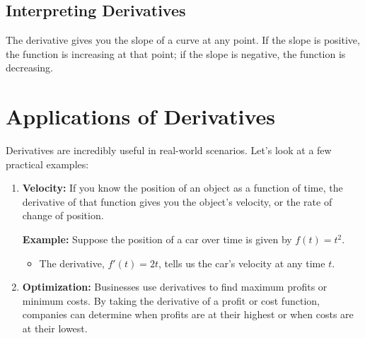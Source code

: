 \subsection{Interpreting Derivatives}
The derivative gives you the slope of a curve at any point. If the slope is positive, the function is increasing at that point; if the slope is negative, the function is decreasing.

\section{Applications of Derivatives}
Derivatives are incredibly useful in real-world scenarios. Let’s look at a few practical examples:
\begin{enumerate}
    \item \textbf{Velocity:} If you know the position of an object as a function of time, the derivative of that function gives you the object’s velocity, or the rate of change of position.

    \textbf{Example:} Suppose the position of a car over time is given by \( f(t) = t^2 \).
    \begin{itemize}
        \item The derivative, \( f'(t) = 2t \), tells us the car’s velocity at any time \( t \).
    \end{itemize}
    
    \begin{center}
    \end{center}

    \item \textbf{Optimization:} Businesses use derivatives to find maximum profits or minimum costs. By taking the derivative of a profit or cost function, companies can determine when profits are at their highest or when costs are at their lowest.


\end{enumerate}
